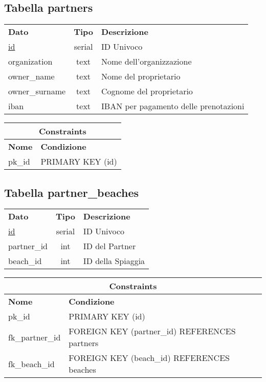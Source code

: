 \begin{center}
    \subsection*{Tabella \textnormal{partners}}
    
    \begin{tabularx}{\textwidth}{l c X}
        \toprule
        \textbf{Dato} & \textbf{Tipo} & \textbf{Descrizione}\\
        \underline{id} & serial & ID Univoco \\
        organization & text & Nome dell'organizzazione\\
        owner\_name & text & Nome del proprietario\\
        owner\_surname & text & Cognome del proprietario\\
        iban & text & IBAN per pagamento delle prenotazioni\\
        \midrule
    \end{tabularx}
    \begin{tabularx}{\textwidth}{l X}
        \multicolumn{2}{c}{\textbf{Constraints}}\\
        \midrule
        \textbf{Nome} & \textbf{Condizione}\\
        pk\_id & PRIMARY KEY (id)\\
        \bottomrule
    \end{tabularx}
    \bigskip
\end{center}

\begin{center}
    \subsection*{Tabella \textnormal{partner\_beaches}}
    
    \begin{tabularx}{\textwidth}{l c X}
        \toprule
        \textbf{Dato} & \textbf{Tipo} & \textbf{Descrizione}\\
        \underline{id} & serial & ID Univoco \\
        partner\_id & int & ID del Partner\\
        beach\_id & int & ID della Spiaggia\\
        \midrule
    \end{tabularx}
    \begin{tabularx}{\textwidth}{l X}
        \multicolumn{2}{c}{\textbf{Constraints}}\\
        \midrule
        \textbf{Nome} & \textbf{Condizione}\\
        pk\_id & PRIMARY KEY (id)\\
        fk\_partner\_id & FOREIGN KEY (partner\_id) REFERENCES partners\\
        fk\_beach\_id & FOREIGN KEY (beach\_id) REFERENCES beaches\\
        \bottomrule
    \end{tabularx}
    \bigskip
\end{center}

